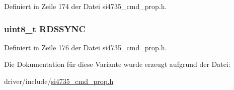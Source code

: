 Definiert in Zeile 174 der Datei si4735\+\_\+cmd\+\_\+prop.\+h.

\hypertarget{unionfm__rds__status__resp2_acdf4253982980384be3340fd9a9ab7c5}{}
\subsubsection[{R\+D\+S\+S\+Y\+N\+C}]{\setlength{\rightskip}{0pt plus 5cm}uint8\+\_\+t R\+D\+S\+S\+Y\+N\+C}\label{unionfm__rds__status__resp2_acdf4253982980384be3340fd9a9ab7c5}


Definiert in Zeile 176 der Datei si4735\+\_\+cmd\+\_\+prop.\+h.



Die Dokumentation für diese Variante wurde erzeugt aufgrund der Datei\+:\begin{DoxyCompactItemize}
\item 
driver/include/\hyperlink{si4735__cmd__prop_8h}{si4735\+\_\+cmd\+\_\+prop.\+h}\end{DoxyCompactItemize}
